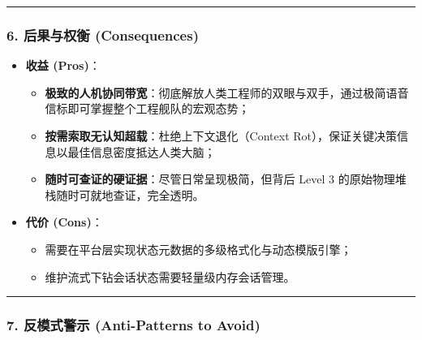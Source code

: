 \begin{center}\rule{0.5\linewidth}{0.5pt}\end{center}

\subsubsection{6. 后果与权衡
(Consequences)}\label{ux540eux679cux4e0eux6743ux8861-consequences-15}

\begin{itemize}
\tightlist
\item
  \textbf{收益 (Pros)}：

  \begin{itemize}
  \tightlist
  \item
    \textbf{极致的人机协同带宽}：彻底解放人类工程师的双眼与双手，通过极简语音信标即可掌握整个工程舰队的宏观态势；
  \item
    \textbf{按需索取无认知超载}：杜绝上下文退化（Context
    Rot），保证关键决策信息以最佳信息密度抵达人类大脑；
  \item
    \textbf{随时可查证的硬证据}：尽管日常呈现极简，但背后 Level 3
    的原始物理堆栈随时可就地查证，完全透明。
  \end{itemize}
\item
  \textbf{代价 (Cons)}：

  \begin{itemize}
  \tightlist
  \item
    需要在平台层实现状态元数据的多级格式化与动态模版引擎；
  \item
    维护流式下钻会话状态需要轻量级内存会话管理。
  \end{itemize}
\end{itemize}

\begin{center}\rule{0.5\linewidth}{0.5pt}\end{center}

\subsubsection{7. 反模式警示 (Anti-Patterns to
Avoid)}\label{ux53cdux6a21ux5f0fux8b66ux793a-anti-patterns-to-avoid-15}

